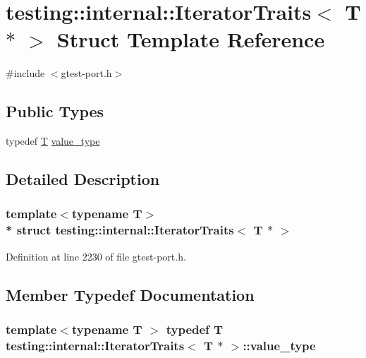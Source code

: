 \hypertarget{structtesting_1_1internal_1_1_iterator_traits_3_01_t_01_5_01_4}{}\section{testing\+:\+:internal\+:\+:Iterator\+Traits$<$ T $\ast$ $>$ Struct Template Reference}
\label{structtesting_1_1internal_1_1_iterator_traits_3_01_t_01_5_01_4}


{\ttfamily \#include $<$gtest-\/port.\+h$>$}

\subsection*{Public Types}
\begin{DoxyCompactItemize}
\item 
typedef \hyperlink{functions__7_8js_adf1f3edb9115acb0a1e04209b7a9937b}{T} \hyperlink{structtesting_1_1internal_1_1_iterator_traits_3_01_t_01_5_01_4_a7e46869ed36cc5aea898e243d270a8be}{value\+\_\+type}
\end{DoxyCompactItemize}


\subsection{Detailed Description}
\subsubsection*{template$<$typename T$>$\\*
struct testing\+::internal\+::\+Iterator\+Traits$<$ T $\ast$ $>$}



Definition at line 2230 of file gtest-\/port.\+h.



\subsection{Member Typedef Documentation}
\subsubsection[{\texorpdfstring{value\+\_\+type}{value_type}}]{\setlength{\rightskip}{0pt plus 5cm}template$<$typename T $>$ typedef {\bf T} {\bf testing\+::internal\+::\+Iterator\+Traits}$<$ {\bf T} $\ast$ $>$\+::{\bf value\+\_\+type}}\hypertarget{structtesting_1_1internal_1_1_iterator_traits_3_01_t_01_5_01_4_a7e46869ed36cc5aea898e243d270a8be}{}\label{structtesting_1_1internal_1_1_iterator_traits_3_01_t_01_5_01_4_a7e46869ed36cc5aea898e243d270a8be}


